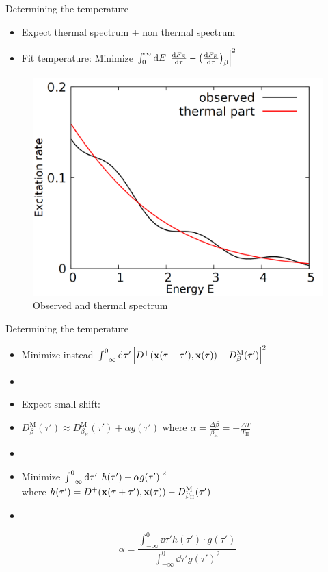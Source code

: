 \documentclass{beamer}
\newcommand{\upd}[1]{^\mathrm{#1}}
\newcommand{\ind}[1]{_\mathrm{#1}}
\begin{document}
\begin{frame}{Determining the temperature}
\begin{itemize}
	\item Expect thermal spectrum + non thermal spectrum
	\item Fit temperature: Minimize \(\int_0^\infty \dd{E} \qty|\dv{F_E}{\tau} - \qty(\dv{F_{E}}{\tau})_\beta|^2\)
\end{itemize}
\begin{figure}
\centering
\includegraphics[scale=0.15]{plot/thermal_fit.png}
\caption{Observed and thermal spectrum}
\end{figure}
\end{frame}

\begin{frame}{Determining the temperature}
\begin{itemize}
	\item Minimize instead \(\int_{-\infty}^0 \dd{\tau'} \qty|D^+(\vb{x}(\tau + \tau'), \vb{x}(\tau)) - D_\beta\upd{M}(\tau')|^2\)
	\item[]
	\item Expect small shift: 
	\item[] \(D_\beta\upd{M}(\tau') \approx D_{\beta\ind{H}}\upd{M}(\tau') + \alpha g(\tau')\) where \(\alpha = \frac{\Delta\beta}{\beta\ind{H}} = - \frac{\Delta T}{T\ind{H}}\)
	\item[]
	\item Minimize \(\int_{-\infty}^0 \dd{\tau'} \qty|h(\tau') - \alpha g(\tau')|^2\)\\
	where \(h(\tau') = D^+(\vb{x}(\tau + \tau'), \vb{x}(\tau)) - D_{\beta\ind{H}}\upd{M}(\tau')\)
	\item[]
\end{itemize}
\[\alpha = \frac{\int_{-\infty}^0 \dd{\tau'} h(\tau')\cdot g(\tau')}{\int_{-\infty}^0 \dd{\tau'} g(\tau')^2}\] 
\end{frame}
\end{document}

